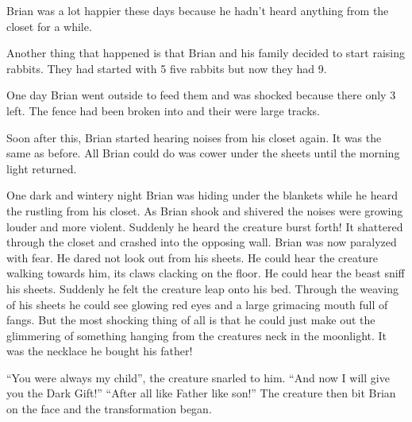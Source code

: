 Brian was a lot happier these days because he hadn't heard anything
from the closet for a while.



Another thing that happened is that Brian and his family decided to
start raising rabbits. They had started with 5 five rabbits but now
they had 9.



One day Brian went outside to feed them and was shocked because
there only 3 left. The fence had been broken into and their were
large tracks.



Soon after this, Brian started hearing noises from his closet again.
It was the same as before. All Brian could do was cower under the
sheets until the morning light returned.



One dark and wintery night Brian was hiding under the blankets
while he heard the rustling from his closet. As Brian shook and
shivered the noises were growing louder and more violent. Suddenly
he heard the creature burst forth! It shattered through the closet
and crashed into the opposing wall. Brian was now paralyzed with
fear. He dared not look out from his sheets. He could hear the
creature walking towards him, its claws clacking on the floor. He
could hear the beast sniff his sheets. Suddenly he felt the
creature leap onto his bed. Through the weaving of his sheets he
could see glowing red eyes and a large grimacing mouth full of
fangs. But the most shocking thing of all is that he could just
make out the glimmering of something hanging from the creatures
neck in the moonlight. It was the necklace he bought his
father!



``You were always my child'', the creature snarled to him. ``And now I
will give you the Dark Gift!'' ``After all like Father like son!'' The
creature then bit Brian on the face and the transformation began. 

 



